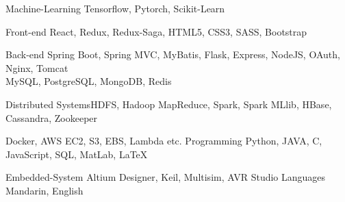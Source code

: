 

\begin{cvskills}[]

  \cvskill
    {Machine-Learning} %
    {Tensorflow, Pytorch, Scikit-Learn} %

  \cvskill
    {Front-end} %
    {React, Redux, Redux-Saga, HTML5, CSS3, SASS, Bootstrap} %

  \cvskill
    {Back-end} %
    {Spring Boot, Spring MVC, MyBatis, Flask, Express, NodeJS, OAuth, Nginx, Tomcat \\ MySQL, PostgreSQL, MongoDB, Redis} %

  \cvskill
    {Distributed Systems}{HDFS, Hadoop MapReduce, Spark, Spark MLlib, HBase, Cassandra, Zookeeper}

    {Docker, AWS EC2, S3, EBS, Lambda etc.}
  \cvskill
    {Programming} %
    {Python, JAVA, C, JavaScript, SQL, MatLab, LaTeX} %

  \cvskill
    {Embedded-System}
    {Altium Designer, Keil, Multisim, AVR Studio}
  \cvskill
    {Languages} %
    {Mandarin, English} %

\end{cvskills}
